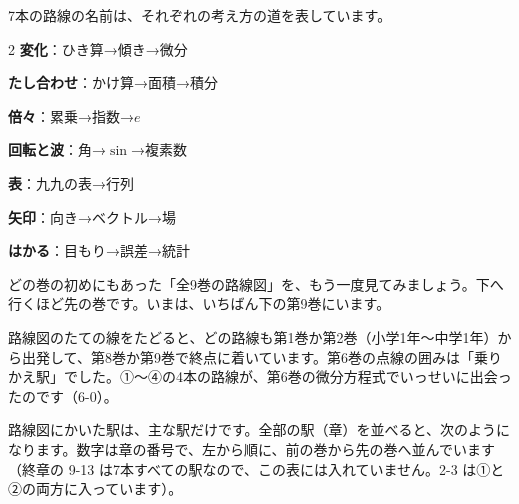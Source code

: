 7本の路線の名前は、それぞれの考え方の道を表しています。
\begin{multicols}{2}\setlength{\columnsep}{6mm}
\noindent{}\enspace\textbf{変化}：ひき算→傾き→微分\par
\noindent{}\enspace\textbf{たし合わせ}：かけ算→面積→積分\par
\noindent{}\enspace\textbf{倍々}：累乗→指数→$e$\par
\noindent{}\enspace\textbf{回転と波}：角→$\sin$→複素数\par
\noindent{}\enspace\textbf{表}：九九の表→行列\par
\noindent{}\enspace\textbf{矢印}：向き→ベクトル→場\par
\noindent{}\enspace\textbf{はかる}：目もり→誤差→統計\par
\end{multicols}


\label{bk:9-13:rosenzu}どの巻の初めにもあった「全9巻の路線図」を、もう一度見てみましょう。下へ行くほど先の巻です。いまは、いちばん下の第9巻にいます。

\begin{bkfigure}
\resizebox{112mm}{!}{\makeatletter\bkSeriesMap\makeatother}
\label{bk:9-13:fig-rosenzu}
\end{bkfigure}

路線図のたての線をたどると、どの路線も第1巻か第2巻（小学1年〜中学1年）から出発して、第8巻か第9巻で終点に着いています。第6巻の点線の囲みは「乗りかえ駅」でした。①〜④の4本の路線が、第6巻の微分方程式でいっせいに出会ったのです（6-0）。


\label{bk:9-13:eki}路線図にかいた駅は、主な駅だけです。全部の駅（章）を並べると、次のようになります。数字は章の番号で、左から順に、前の巻から先の巻へ並んでいます（終章の 9-13 は7本すべての駅なので、この表には入れていません。2-3 は①と②の両方に入っています）。

